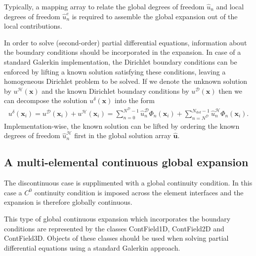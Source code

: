 Typically, a mapping array to relate the global degrees of freedom
$\hat{u}_n$ and local degrees of freedom $\hat{u}_n^e$ is
required to assemble the global expansion out of the local contributions.

In order to solve (second-order) partial differential equations, information
 about the boundary conditions should be incorporated in the expansion. In case
 of a standard Galerkin implementation, the Dirichlet boundary conditions can be
 enforced by lifting a known solution satisfying these conditions, leaving a
 homogeneous Dirichlet problem to be solved. If we denote the unknown solution
 by $u^{\mathcal{H}}(\boldsymbol{x})$ and the known Dirichlet
 boundary conditions by $u^{\mathcal{D}}(\boldsymbol{x})$ then we can
 decompose the solution $u^{\delta}(\boldsymbol{x})$ into the form
\begin{align*}
  u^{\delta}(\boldsymbol{x}_i)=u^{\mathcal{D}}(\boldsymbol{x}_i)+
  u^{\mathcal{H}}(\boldsymbol{x}_i)=\sum_{n=0}^{N^{\mathcal{D}}-1}
  \hat{u}_n^{\mathcal{D}}\Phi_n(\boldsymbol{x}_i)+
  \sum_{n={N^{\mathcal{D}}}}^{N_{\mathrm{dof}}-1}
  \hat{u}_n^{\mathcal{H}}\Phi_n(\boldsymbol{x}_i).
\end{align*}
Implementation-wise, the known solution can be lifted by ordering the known
degrees of freedom $\hat{u}_n^{\mathcal{H}}$ first in the global
solution array $\boldsymbol{\hat{u}}$.


\subsection{A multi-elemental continuous global expansion}
The discontinuous case is supplimented with a global continuity condition. In
this case a $C^0$ continuity condition is imposed across the element
interfaces and the expansion is therefore globally continuous.

This type of global continuous expansion which incorporates the boundary
 conditions are represented by the classes ContField1D, ContField2D and
 ContField3D. Objects of these classes should be used when solving partial
 differential equations using a standard Galerkin approach.



